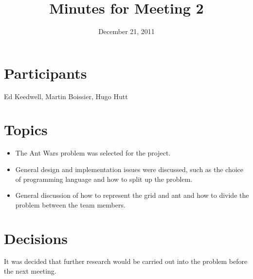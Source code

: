 \documentclass[a4paper, 11pt]{article}
\date{December 21, 2011}
\title{Minutes for Meeting 2}
\begin{document}
\maketitle

\section{Participants}

Ed Keedwell, Martin Boissier, Hugo Hutt

\section{Topics}

\begin{itemize}
\item The Ant Wars problem was selected for the project.
\item General design and implementation issues were discussed, such as
  the choice of programming language and how to split up the problem.
\item General discussion of how to represent the grid and ant and how
  to divide the problem between the team members.
\end{itemize}

\section{Decisions}

It was decided that further research would be carried out into
the problem before the next meeting.
\end{document}
